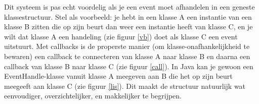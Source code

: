 \documentclass[a4paper,11pt,oneside, titlepage]{article}
\begin{document}
Dit systeem is pas echt voordelig als je een event moet afhandelen in een geneste klassestructuur. 
Stel als voorbeeld: je hebt in een klasse A een instantie van een klasse B zitten
die op zijn beurt dan weer een instantie heeft van klasse C, en je wilt dat klasse A een handeling (zie figuur \ref{vb}) doet als klasse C een event uitstuurt.
Met callbacks is de properste manier (om klasse-onafhankelijkheid te bewaren) een callback 
te connecteren van klasse A naar klasse B en daarna een callback van klasse B naar klasse C (zie figuur \ref{call}).
In Java kan je gewoon een EventHandle-klasse vanuit klasse A meegeven aan B die het op zijn 
beurt meegeeft aan klasse C (zie figuur \ref{lis}). Dit maakt de structuur natuurlijk wat eenvoudiger, overzichtelijker, en makkelijker te begrijpen.\newline \newline
\end{document}
